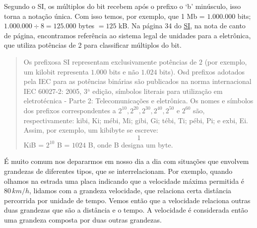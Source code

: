 Segundo o SI, os múltiplos do bit recebem após o prefixo o ‘b’ minúsculo, isso torna a notação única. Com isso temos, por exemplo, que 1 Mb = $1.000.000$ bits; $1.000.000 \div 8 = 125.000$ bytes $=125$ kB. Na página 34 do \href{http://www.inmetro.gov.br/inovacao/publicacoes/si\_versao\_final.pdf}{SI}, na nota de canto de página, encontramos referência ao sistema legal de unidades para a eletrônica, que utiliza potências de 2 para classificar múltiplos do bit.

\begin{quote}
Os prefixosa SI representam exclusivamente potências de $2$ (por exemplo, um kilobit representa $1.000$ bits e não $1.024$ bits). Osd prefixos adotados pela IEC para as potências binárias são publicados na norma internacional IEC 60027-2: 2005, 3$^{\text{a}}$ edição, símbolos literais para utilização em eletrotécnica - Parte 2: Telecomunicações e eletrônica. Os nomes e símbolos dos prefixos correspondentes a $2^{10}, 2^{20}, 2^{30}, 2^{40}, 2^{50} \text{ e } 2^{60}$ são, respectivamente: kibi, Ki; mébi, Mi; gibi, Gi; tébi, Ti; pébi, Pi; e exbi, Ei. Assim, por exemplo, um kibibyte se escreve: $$1$$ KiB = $2^{10}$ B = $1024$ B, onde B designa um byte. 
\end{quote}

\label{\detokenize{NO103-2::doc}}\label{\detokenize{NO103-2:explorando-grandezas-compostas}}


É muito comum nos depararmos em nosso dia a dia com situações que envolvem grandezas de diferentes tipos, que se interrelacionam. Por exemplo, quando olhamos na estrada uma placa indicando que a velocidade máxima permitida é $80\,km/h$, lidamos com a grandeza velocidade, que relaciona certa distância percorrida por unidade de tempo. Vemos então que a  velocidade relaciona outras duas  grandezas que são a distância e o tempo. A velocidade é considerada então uma grandeza composta por duas outras grandezas.

